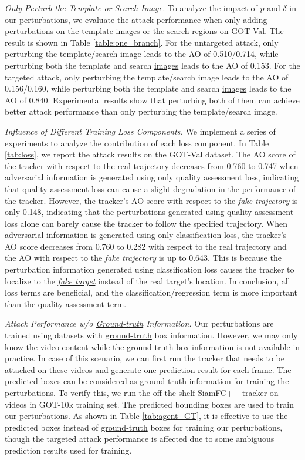 \documentclass[journal]{IEEEtran}
\begin{document}
\textit{Only Perturb the Template or Search Image.} To analyze the impact of $p$ and $\delta$ in our perturbations, we evaluate the attack performance when only adding perturbations on the template images or the search regions on GOT-Val. The result is shown in Table \ref{table:one_branch}. For the untargeted attack, only perturbing the template/search image leads to the AO of 0.510/0.714, while perturbing both the template and search \uline{images} leads to the AO of 0.153. For the targeted attack, only perturbing the template/search image leads to the AO of 0.156/0.160, while perturbing both the template and search \uline{images} leads to the AO of 0.840. Experimental results show that perturbing both of them can achieve better attack performance than only perturbing the template/search image.

\textit{Influence of Different Training Loss Components.} We implement a series of experiments to analyze the contribution of each loss component. In Table \ref{tab:loss}, we report the attack results on the GOT-Val dataset. The AO score of the tracker with respect to the real trajectory decreases from 0.760 to 0.747 when adversarial information is generated using only quality assessment loss, indicating that quality assessment loss can cause a slight degradation in the performance of the tracker. However, the tracker's AO score with respect to the \textit{fake trajectory} is only 0.148, indicating that the perturbations generated using quality assessment loss alone can barely cause the tracker to follow the specified trajectory. When adversarial information is generated using only classification loss, the tracker's AO score decreases from 0.760 to 0.282 with respect to the real trajectory and the AO with respect to the \textit{fake trajectory} is up to 0.643. This is because the perturbation information generated using classification loss causes the tracker to localize to the \uline{\textit{fake target}} instead of the real target's location. In conclusion, all loss terms are beneficial, and the classification/regression term is more important than the quality assessment term.

\textit{Attack Performance w/o \uline{Ground-truth} Information.} Our perturbations are trained using datasets with \uline{ground-truth} box information. However, we may only know the video content while the \uline{ground-truth} box information is not available in practice. In case of this scenario, we can first run the tracker that needs to be attacked on these videos and generate one prediction result for each frame. The predicted boxes can be considered as \uline{ground-truth} information for training the perturbations. To verify this, we run the off-the-shelf SiamFC++ tracker on videos in GOT-10k training set. The predicted bounding boxes are used to train our perturbations. As shown in Table \ref{tab:agent_GT}, it is effective to use the predicted boxes instead of \uline{ground-truth} boxes for training our perturbations, though the targeted attack performance is affected due to some ambiguous prediction results used for training.
\end{document}
